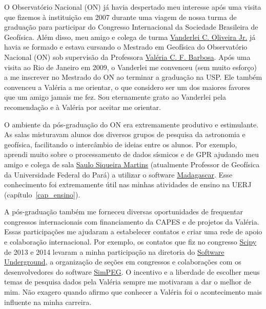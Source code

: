 \documentclass[10pt,a4paper,oneside]{book}
\begin{document}
O Observatório Nacional (ON) já havia despertado meu interesse após uma visita
que fizemos à instituição em 2007 durante uma viagem de nossa turma de
graduação para participar do Congresso Internacional da Sociedade Brasileira de
Geofísica.
Além disso, meu amigo e colega de turma
\href{https://www.pinga-lab.org/people/oliveira-jr.html}{Vanderlei C. Oliveira Jr.}
já havia se formado e estava cursando o Mestrado em Geofísica do Observatório
Nacional (ON) sob supervisão da Professora
\href{https://www.pinga-lab.org/people/barbosa.html}{Valéria C. F. Barbosa}.
Após uma visita ao Rio de Janeiro em 2009, o Vanderlei me convenceu (sem muito
esforço) a me inscrever no Mestrado do ON ao terminar a graduação na USP.
Ele também convenceu a Valéria a me orientar, o que considero ser um dos
maiores favores que um amigo jamais me fez.
Sou eternamente grato ao Vanderlei pela recomendação e à Valéria por aceitar me
orientar.

O ambiente da pós-graduação do ON era extremamente produtivo e estimulante.
As salas misturavam alunos dos diversos grupos de pesquisa da astronomia e
geofísica, facilitando o intercâmbio de ideias entre os alunos.
Por exemplo, aprendi muito sobre o processamento de dados sísmicos e de GPR
ajudando meu amigo e colega de sala
\href{https://www.linkedin.com/in/saulo-siqueira-martins-78770878/}{Saulo Siqueira Martins}
(atualmente Professor de Geofísica da Universidade Federal do Pará)
a utilizar o software \href{https://www.reproducibility.org/}{Madagascar}.
Esse conhecimento foi extremamente útil nas minhas atividades de ensino na
UERJ (capítulo~\ref{cap_ensino}).

A pós-graduação também me forneceu diversas oportunidades de frequentar
congressos internacionais com financiamento da CAPES e de projetos da Valéria.
Essas participações me ajudaram a estabelecer contatos e criar uma rede de
apoio e colaboração internacional.
Por exemplo, os contatos que fiz no congresso
\href{https://conference.scipy.org/scipy2014/}{Scipy} de 2013 e 2014 levaram a
minha participação na diretoria do
\href{https://softwareunderground.org/}{Software Underground}, a organização
de seções em congressos e colaborações com os desenvolvedores do software
\href{https://simpeg.xyz/}{SimPEG}.
O incentivo e a liberdade de escolher meus temas de pesquisa dados pela Valéria
sempre me motivaram a dar o melhor de mim.
Não exagero quando afirmo que conhecer a Valéria foi o acontecimento mais
influente na minha carreira.
\end{document}
